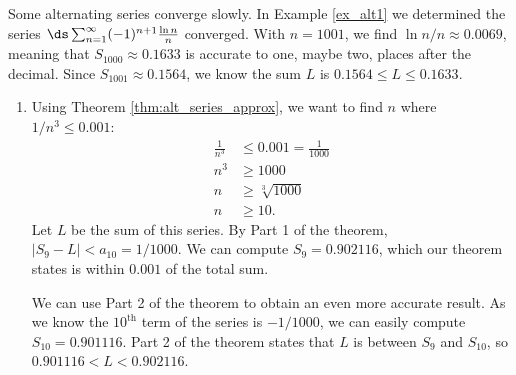 Some alternating series converge slowly. In Example \ref{ex_alt1} we determined the series $\ds\sum_{n=1}^\infty (-1)^{n+1}\frac{\ln n}{n}$ converged. With $n=1001$, we find $\ln n/n \approx 0.0069$, meaning that $S_{1000} \approx 0.1633$ is accurate to one, maybe two, places after the decimal. Since $S_{1001} \approx 0.1564$, we know the sum $L$ is $0.1564\leq L\leq0.1633$.\\

{\begin{enumerate}
	\item  Using Theorem \ref{thm:alt_series_approx}, we want to find $n$ where $1/n^3 \leq 0.001$:
	\begin{align*}
	\frac1{n^3} &\leq 0.001=\frac{1}{1000} \\
	n^3 &\geq 1000\\
	n &\geq \sqrt[3]{1000}\\
	n &\geq 10.
	\end{align*}
	Let $L$ be the sum of this series. By Part 1 of the theorem, $|S_9-L|<a_{10} = 1/1000$. We can compute $S_9=0.902116$, which our theorem states is within $0.001$ of the total sum. 
	
	We can use Part 2 of the theorem to obtain an even more accurate result. As we know the $10^\text{th}$ term of the series is $-1/1000$, we can easily compute $S_{10} = 0.901116$. Part 2 of the theorem states that $L$ is between $S_9$ and $S_{10}$, so $0.901116 <L<0.902116$.
	

\end{enumerate}}
